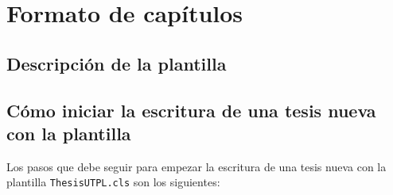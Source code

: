 %
% 
%
%
%

\chapter{Formato de capítulos}

\section{Descripción de la plantilla}




\section{Cómo iniciar la escritura de una tesis nueva con la plantilla}
Los pasos que debe seguir para empezar la escritura de una tesis nueva con la plantilla \texttt{ThesisUTPL.cls} son los siguientes: 

